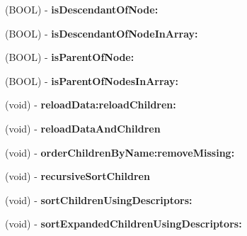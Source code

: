 \begin{DoxyCompactItemize}
\item 
\hypertarget{interface_tree_node_abe841acddad30cbb02e8dd11def68fd6}{
(BOOL) -\/ {\bfseries isDescendantOfNode:}}
\label{interface_tree_node_abe841acddad30cbb02e8dd11def68fd6}

\item 
\hypertarget{interface_tree_node_a0de6b81603f7f480628a63381ca64b1b}{
(BOOL) -\/ {\bfseries isDescendantOfNodeInArray:}}
\label{interface_tree_node_a0de6b81603f7f480628a63381ca64b1b}

\item 
\hypertarget{interface_tree_node_a0b3f572fe4c45ce5d48e5f7de5bcc5e1}{
(BOOL) -\/ {\bfseries isParentOfNode:}}
\label{interface_tree_node_a0b3f572fe4c45ce5d48e5f7de5bcc5e1}

\item 
\hypertarget{interface_tree_node_a98dd9f7952ac712d9b49423270142ec1}{
(BOOL) -\/ {\bfseries isParentOfNodesInArray:}}
\label{interface_tree_node_a98dd9f7952ac712d9b49423270142ec1}

\item 
\hypertarget{interface_tree_node_aaa9cf091ac660c0d58db5302a068e321}{
(void) -\/ {\bfseries reloadData:reloadChildren:}}
\label{interface_tree_node_aaa9cf091ac660c0d58db5302a068e321}

\item 
\hypertarget{interface_tree_node_ae6cd4d74c84ea63fdee61dc08e9edd1c}{
(void) -\/ {\bfseries reloadDataAndChildren}}
\label{interface_tree_node_ae6cd4d74c84ea63fdee61dc08e9edd1c}

\item 
\hypertarget{interface_tree_node_acb142e096cf14de3577990a66226f5fb}{
(void) -\/ {\bfseries orderChildrenByName:removeMissing:}}
\label{interface_tree_node_acb142e096cf14de3577990a66226f5fb}

\item 
\hypertarget{interface_tree_node_af580eb958bf484cc018d0ed6ec5f43a8}{
(void) -\/ {\bfseries recursiveSortChildren}}
\label{interface_tree_node_af580eb958bf484cc018d0ed6ec5f43a8}

\item 
\hypertarget{interface_tree_node_aef2c2aea57baec8de897e43638d98185}{
(void) -\/ {\bfseries sortChildrenUsingDescriptors:}}
\label{interface_tree_node_aef2c2aea57baec8de897e43638d98185}

\item 
\hypertarget{interface_tree_node_a79b2723e2d3ccf751576db9dd24f63c7}{
(void) -\/ {\bfseries sortExpandedChildrenUsingDescriptors:}}
\label{interface_tree_node_a79b2723e2d3ccf751576db9dd24f63c7}


\end{DoxyCompactItemize}
